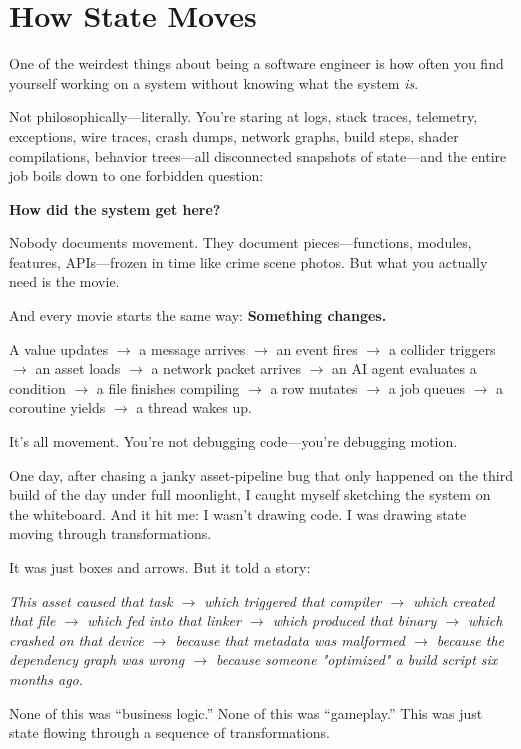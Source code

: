 \section{How State Moves}
\label{sec:how-state-moves}

One of the weirdest things about being a software engineer is how often you find yourself working on a system without knowing what the system \textit{is}.

Not philosophically—literally. You're staring at logs, stack traces, telemetry, exceptions, wire traces, crash dumps, network graphs, build steps, shader compilations, behavior trees—all disconnected snapshots of state—and the entire job boils down to one forbidden question:

\textbf{How did the system get here?}

Nobody documents movement. They document pieces—functions, modules, features, APIs—frozen in time like crime scene photos. But what you actually need is the movie.

And every movie starts the same way: \textbf{Something changes.}

A value updates $\rightarrow$ a message arrives $\rightarrow$ an event fires $\rightarrow$ a collider triggers $\rightarrow$ an asset loads $\rightarrow$ a network packet arrives $\rightarrow$ an AI agent evaluates a condition $\rightarrow$ a file finishes compiling $\rightarrow$ a row mutates $\rightarrow$ a job queues $\rightarrow$ a coroutine yields $\rightarrow$ a thread wakes up.

It's all movement. You're not debugging code—you’re debugging motion.

One day, after chasing a janky asset-pipeline bug that only happened on the third build of the day under full moonlight, I caught myself sketching the system on the whiteboard. And it hit me: I wasn't drawing code. I was drawing state moving through transformations.

It was just boxes and arrows. But it told a story:

\textit{This asset caused that task $\rightarrow$ which triggered that compiler $\rightarrow$ which created that file $\rightarrow$ which fed into that linker $\rightarrow$ which produced that binary $\rightarrow$ which crashed on that device $\rightarrow$ because that metadata was malformed $\rightarrow$ because the dependency graph was wrong $\rightarrow$ because someone "optimized" a build script six months ago.}

None of this was ``business logic.'' None of this was ``gameplay.'' This was just state flowing through a sequence of transformations.

